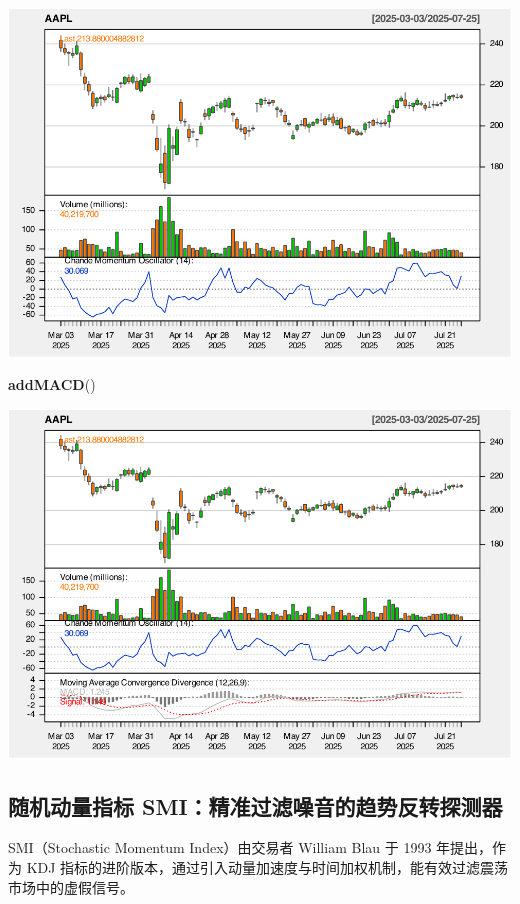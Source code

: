 \documentclass[]{ctexbook}
\newenvironment{Shaded}{\begin{snugshade}}{\end{snugshade}}
\newcommand{\FunctionTok}[1]{\textcolor[rgb]{0.13,0.29,0.53}{\textbf{#1}}}
\newcommand{\NormalTok}[1]{#1}
\begin{document}
\includegraphics[width=0.9\linewidth]{QuantmodHandbook_files/figure-latex/cmo_2-2}

\begin{Shaded}
\begin{Highlighting}[]
\FunctionTok{addMACD}\NormalTok{()}
\end{Highlighting}
\end{Shaded}

\includegraphics[width=0.9\linewidth]{QuantmodHandbook_files/figure-latex/cmo_2-3}

\subsection{随机动量指标 SMI：精准过滤噪音的趋势反转探测器}\label{ux968fux673aux52a8ux91cfux6307ux6807-smiux7cbeux51c6ux8fc7ux6ee4ux566aux97f3ux7684ux8d8bux52bfux53cdux8f6cux63a2ux6d4bux5668}

SMI（Stochastic Momentum Index）由交易者 William Blau 于 1993 年提出，作为 KDJ 指标的进阶版本，通过引入动量加速度与时间加权机制，能有效过滤震荡市场中的虚假信号。
\end{document}
